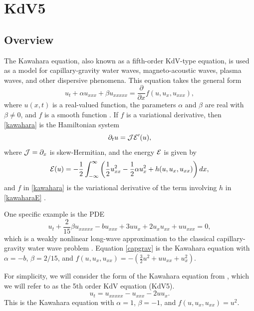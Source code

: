 \documentclass[thesis.tex]{subfiles}
\begin{document}
\iffulldocument\else
	\chapter{KdV5}
\fi

\section{Overview}

The Kawahara equation, also known as a fifth-order KdV-type equation, is used as a model for capillary-gravity water waves, magneto-acoustic waves, plasma waves, and other dispersive phenomena. This equation takes the general form
\begin{equation}\label{kawahara}
u_t + \alpha u_{xxx} + \beta u_{xxxxx} = \frac{\partial}{\partial x} f(u, u_x, u_{xxx}),
\end{equation}
where $u(x, t)$ is a real-valued function, the parameters $\alpha$ and $\beta$ are real with $\beta \neq 0$, and $f$ is a smooth function \cite{Bridges2002,Bridges2002a}. If $f$ is a variational derivative, then \cref{kawahara} is the Hamiltonian system
\[
\partial_t u = \mathcal{J} \mathcal{E}'(u),
\]
where $\mathcal{J} = \partial_x$ is skew-Hermitian, and the energy $\mathcal{E}$ is given by
\begin{equation}\label{kawaharaE}
\mathcal{E}(u) = -\frac{1}{2}\int_{-\infty}^\infty 
\left( \frac{1}{2}u_{xx}^2 - \frac{1}{2}\alpha u_x^2 + h(u, u_x, u_{xx})\right)dx,
\end{equation}
and $f$ in \cref{kawahara} is the variational derivative of the term involving $h$ in \cref{kawaharaE} \cite{Bridges2002}.

One specific example is the PDE
\begin{equation}\label{capgrav}
u_t + \frac{2}{15} \beta u_{xxxxx} - b u_{xxx}
+ 3 u u_x + 2 u_x u_{xx} + u u_{xxx} = 0,
\end{equation}
which is a weakly nonlinear long-wave approximation to the classical capillary-gravity water wave problem \cite{Sandstede2013,Champneys1997,Champneys1998}. Equation \cref{capgrav} is the Kawahara equation with $\alpha = -b$, $\beta = 2/15$, and $f(u, u_x, u_{xx}) = -(\frac{3}{2}u^2 + u u_{xx} + u_x^2)$.

For simplicity, we will consider the form of the Kawahara equation from \cite{Pelinovsky2007}, which we will refer to as the 5th order KdV equation (KdV5).
\begin{equation}\label{KdV5}
u_t = u_{xxxxx} - u_{xxx} - 2 u u_x .
\end{equation}
This is the Kawahara equation with $\alpha = 1$, $\beta = -1$, and $f(u, u_x, u_{xx}) = u^2$.
\end{document}
